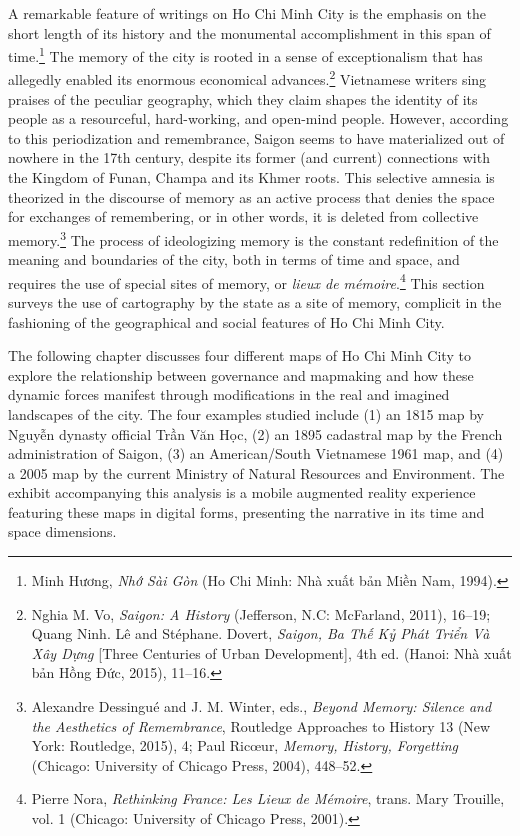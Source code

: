 A remarkable feature of writings on Ho Chi Minh City is the emphasis on the short length of its history and the monumental accomplishment in this span of time.\footnote{\vi Minh Hương, \textit{Nhớ Sài Gòn} (Ho Chi Minh: Nhà xuất bản Miền Nam, 1994).} The memory of the city is rooted in a sense of exceptionalism that has allegedly enabled its enormous economical advances.\footnote{\vi Nghia M. Vo, \textit{Saigon: A History} (Jefferson, N.C: McFarland, 2011), 16–19; Quang Ninh. Lê and Stéphane. Dovert, \textit{Saigon, Ba Thế Kỷ Phát Triển Và Xây Dựng} [Three Centuries of Urban Development], 4th ed. (Hanoi: Nhà xuất bản Hồng Đức, 2015), 11–16.} Vietnamese writers sing praises of the peculiar geography, which they claim shapes the identity of its people as a resourceful, hard-working, and open-mind people. However, according to this periodization and remembrance, Saigon seems to have materialized out of nowhere in the 17th century, despite its former (and current) connections with the Kingdom of Funan, Champa and its Khmer roots. This selective amnesia is theorized in the discourse of memory as an active process that denies the space for exchanges of remembering, or in other words, it is deleted from collective memory.\footnote{Alexandre Dessingué and J. M. Winter, eds., \textit{Beyond Memory: Silence and the Aesthetics of Remembrance}, Routledge Approaches to History 13 (New York: Routledge, 2015), 4; Paul Ricœur, \textit{Memory, History, Forgetting} (Chicago: University of Chicago Press, 2004), 448–52.} The process of ideologizing memory is the constant redefinition of the meaning and boundaries of the city, both in terms of time and space, and requires the use of special sites of memory, or \textit{lieux de mémoire}.\footnote{Pierre Nora, \textit{Rethinking France: Les Lieux de Mémoire}, trans. Mary Trouille, vol. 1 (Chicago: University of Chicago Press, 2001).} This section surveys the use of cartography by the state as a site of memory, complicit in the fashioning of the geographical and social features of Ho Chi Minh City.

The following chapter discusses four different maps of Ho Chi Minh City to explore the relationship between governance and mapmaking and how these dynamic forces manifest through modifications in the real and imagined landscapes of the city. The four examples studied include (1) an 1815 map by \vi Nguyễn dynasty official Trần Văn Học, (2) an 1895 cadastral map by the French administration of Saigon, (3) an American/South Vietnamese 1961 map, and (4) a 2005 map by the current Ministry of Natural Resources and Environment. The exhibit accompanying this analysis is a mobile augmented reality experience featuring these maps in digital forms, presenting the narrative in its time and space dimensions. \en

